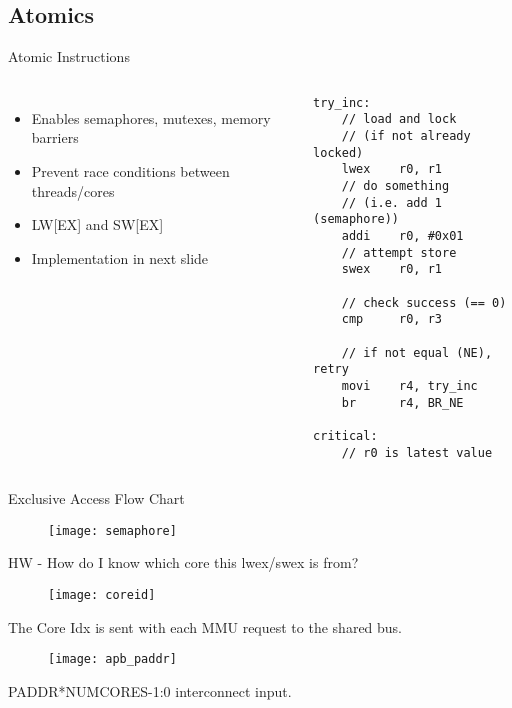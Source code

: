 \documentclass[aspectratio=169]{beamer}
\begin{document}
\subsection{Atomics}
\begin{frame}[fragile]{Atomic Instructions}
\begin{columns}[t]
\begin{itemize}\setlength{\itemsep 1em}
    \item Enables semaphores, mutexes, memory barriers
    \item Prevent race conditions between threads/cores
    \item LW[EX] and SW[EX]
    \item Implementation in next slide
\end{itemize}
\begin{lstlisting}[basicstyle=\scriptsize\ttfamily]
try_inc:
    // load and lock
    // (if not already locked)
    lwex    r0, r1
    // do something
    // (i.e. add 1 (semaphore))
    addi    r0, #0x01
    // attempt store
    swex    r0, r1
    
    // check success (== 0)
    cmp     r0, r3
    
    // if not equal (NE), retry
    movi    r4, try_inc
    br      r4, BR_NE
    
critical:
    // r0 is latest value
\end{lstlisting}
\end{columns}
\end{frame}

\begin{frame}{Exclusive Access Flow Chart}
    \begin{figure}
        \centering
        \texttt{[image: semaphore]}
    \end{figure}
\end{frame}

\begin{frame}{HW - How do I know which core this lwex/swex is from?}
    \begin{figure}
        \centering
        \texttt{[image: coreid]}
    \end{figure}
    The Core Idx is sent with each MMU request to the shared bus.\\
    \begin{figure}
        \centering
        \texttt{[image: apb\_paddr]}
    \end{figure}
    PADDR*NUMCORES-1:0 interconnect input.
\end{frame}
\end{document}
